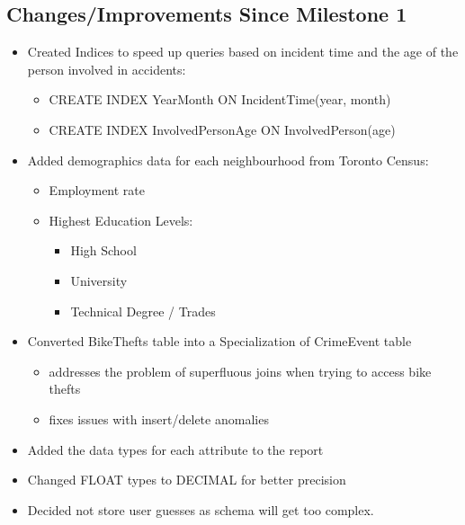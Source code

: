 \documentclass[12pt, a4paper]{article}
\begin{document}
\subsection*{Changes/Improvements Since Milestone 1}
\color{black}
\begin{itemize}
    \item Created Indices to speed up queries based on incident time and the age of the person involved in accidents:
    \begin{itemize}
        \item CREATE INDEX YearMonth ON IncidentTime(year, month)
        \item CREATE INDEX InvolvedPersonAge ON InvolvedPerson(age)
    \end{itemize}
    \item Added demographics data for each neighbourhood from Toronto Census:
    \begin{itemize}
        \item Employment rate %
        \item Highest Education Levels:
        \begin{itemize}
            \item High School %
            \item University %
            \item Technical Degree / Trades %
        \end{itemize}
    \end{itemize}
    \item Converted BikeThefts table into a Specialization of CrimeEvent table
    \begin{itemize}
        \item addresses the problem of superfluous joins when trying to access bike thefts
        \item fixes issues with insert/delete anomalies
    \end{itemize}
    \item Added the data types for each attribute to the report
     \item Changed FLOAT types to DECIMAL for better precision
     \item Decided not store user guesses as schema will get too complex.
\end{itemize}
\end{document}
